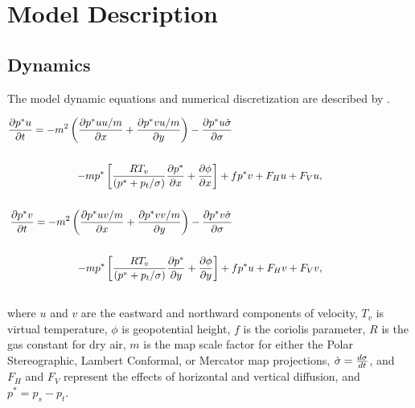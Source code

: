 
\newpage

\section{Model Description}

\subsection{Dynamics} The model dynamic equations and numerical discretization
are described by \cite{Grell_94}.

 \begin{eqnarray} \nonumber
{\partial{p^{\ast}u} \over \partial{t}} = -m^2 \left( {\partial{p^{\ast}uu/m}
\over \partial{x}} + {\partial{p^{\ast}vu/m} \over \partial{y}} \right) -
{\partial{p^{\ast}u \dot{\sigma}} \over \partial{\sigma}}  \hspace{6cm} \\
\nonumber \\ 
- m p^{\ast} \left[ {RT_v \over ({p^{\ast} + p_t/\sigma)}} {\partial{p^{\ast}}
  \over \partial{x}} + {\partial{\phi} \over \partial{x}} \right] + fp^{\ast}v +
F_Hu + F_Vu, \hspace{3cm} \\\nonumber \\ \nonumber {\partial{p^{\ast}v} \over
\partial{t}} = -m^2 \left( {\partial{p^{\ast}uv/m} \over \partial{x}} +
{\partial{p^{\ast}vv/m} \over \partial{y}} \right) - {\partial{p^{\ast}v
\dot{\sigma}} \over \partial{\sigma}}  \hspace{6cm} \\ \nonumber \\
- m p^{\ast} \left[ {RT_v \over ({p^{\ast} + p_t/\sigma)}} {\partial{p^{\ast}}
  \over \partial{y}} + {\partial{\phi} \over \partial{y}} \right] + fp^{\ast}u +
F_Hv + F_Vv, \hspace{3cm} \\ \nonumber \end{eqnarray} \noindent where $u$ and
$v$ are the eastward and northward components of velocity, $T_v$ is virtual
temperature, $\phi$ is geopotential height, $f$ is the coriolis parameter, $R$
is the gas constant for dry air, $m$ is the map scale factor for either the
Polar Stereographic, Lambert Conformal, or Mercator map projections,
$\dot{\sigma} = {d\sigma \over dt}$, and $F_H$ and $F_V$ represent the effects
of horizontal and vertical diffusion, and $p^{\ast}=p_s-p_t$.  \\

